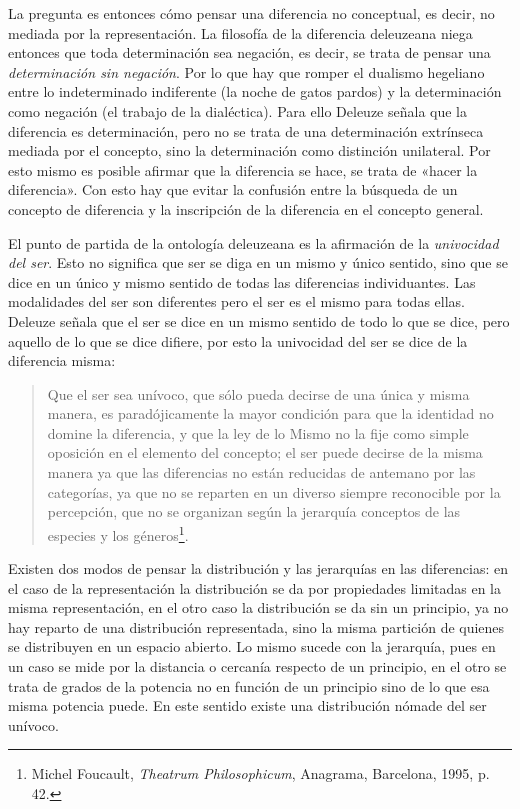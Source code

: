 La pregunta es entonces cómo pensar una diferencia no conceptual, es decir, no mediada por la representación. La filosofía de la diferencia deleuzeana niega entonces que toda determinación sea negación, es decir, se trata de pensar una \emph{determinación sin negación}. Por lo que hay que romper el dualismo hegeliano entre lo indeterminado indiferente (la noche de gatos pardos) y la determinación como negación (el trabajo de la dialéctica). Para ello Deleuze señala que la diferencia es determinación, pero no se trata de una determinación extrínseca mediada por el concepto, sino la determinación como distinción unilateral. Por esto mismo es posible afirmar que la diferencia se hace, se trata de «hacer la diferencia». Con esto hay que evitar la confusión entre la búsqueda de un concepto de diferencia y la inscripción de la diferencia en el concepto general.

El punto de partida de la ontología deleuzeana es la afirmación de la \emph{univocidad del ser}. Esto no significa que ser se diga en un mismo y único sentido, sino que se dice en un único y mismo sentido de todas las diferencias individuantes. Las modalidades del ser son diferentes pero el ser es el mismo para todas ellas. Deleuze señala que el ser se dice en un mismo sentido de todo lo que se dice, pero aquello de lo que se dice difiere, por esto la univocidad del ser se dice de la diferencia misma:

\begin{quote}
Que el ser sea unívoco, que sólo pueda decirse de una única y misma manera, es paradójicamente la mayor condición para que la identidad no domine la diferencia, y que la ley de lo Mismo no la fije como simple oposición en el elemento del concepto; el ser puede decirse de la misma manera ya que las diferencias no están reducidas de antemano por las categorías, ya que no se reparten en un diverso siempre reconocible por la percepción, que no se organizan según la jerarquía conceptos de las especies y los géneros\footnote{Michel Foucault, \emph{Theatrum Philosophicum}, Anagrama, Barcelona, 1995, p. 42.}.
\end{quote}

Existen dos modos de pensar la distribución y las jerarquías en las diferencias: en el caso de la representación la distribución se da por propiedades limitadas en la misma representación, en el otro caso la distribución se da sin un principio, ya no hay reparto de una distribución representada, sino la misma partición de quienes se distribuyen en un espacio abierto. Lo mismo sucede con la jerarquía, pues en un caso se mide por la distancia o cercanía respecto de un principio, en el otro se trata de grados de la potencia no en función de un principio sino de lo que esa misma potencia puede. En este sentido existe una distribución nómade del ser unívoco.

